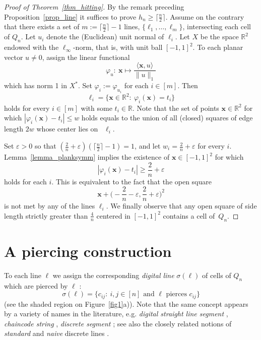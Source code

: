 \documentclass[11pt,a4paper]{amsart}
\newcommand{\R}{\mathbb{R}}
\newcommand{\eps}{\varepsilon}
\newcommand{\x}{\mathbf{x}}
\begin{document}
\begin{proof}[Proof of Theorem~\ref{thm_hitting}]
By the remark  preceding Proposition~\ref{prop_line}  it suffices to prove $h_n \geq \lceil \frac n 2 \rceil$. Assume on the contrary that there exists a set of $m := \lceil \frac n 2 \rceil -1$ lines,
$\{\ell_1, \ldots, \ell_m \}$, intersecting each cell of $Q_n$. Let  $u_i$ denote the (Euclidean) unit normal of $\ell_i$. Let $X$ be the space $\R^2$ endowed with the $\ell_\infty$-norm, that is, with unit ball $[-1,1]^2$. To each planar vector $u \neq 0$, assign the linear functional
\begin{equation}\label{phidef}
\varphi_u: \ \x \mapsto \frac{  \langle \x, u \rangle }{\|u \|_1}
\end{equation}
which has norm 1 in $X^*$.
Set $\varphi_i := \varphi_{u_i}$ for each $i \in [m]$. Then
\begin{equation}\label{ellidef}
\ell_i = \{\x \in \R^2: \ \varphi_i(\x) = t_i  \}
\end{equation}
holds for every $i \in [m]$ with some $t_i \in \R$.
Note that the set of points $\x \in \R^2$ for which $|\varphi_i(\x) - t_i| \leq w$ holds equals to the union of all (closed) squares of edge length $ 2 w$ whose center lies on~ $\ell_i$.

Set $\eps >0 $ so that $(\frac 2 n + \eps)(\lceil \frac n 2 \rceil - 1) = 1$, and let $w_i = \frac 2 n + \eps$ for every $i$. Lemma~\ref{lemma_planksymm} implies the existence of $\x \in [- 1,1]^2$ for which
\[
|\varphi_i(\x) - t_i|\geq \frac 2 n + \eps
\]
holds for each $i$. This is equivalent to the fact that the open square
\[
\x + \Big(- \frac 2  n  - \eps, \frac 2 n  + \eps \Big)^2
\]
is not met by any of the lines $\ell_i$. We finally observe that any open square of side length strictly greater than $\frac 4 n $ centered in $[-1,1]^2$   contains a cell of~$Q_n$.
\end{proof}




\section{A piercing construction}



To each line $\ell$ we assign the corresponding {\em digital line}  \cite{R91} $\sigma(\ell)$ of cells of $Q_n$ which are pierced by $\ell$ :
\begin{equation}\label{sigmadef}
  \sigma(\ell) = \{ c_{ij}: \ i,j \in [n] \textrm{ and } \ell \textrm{ pierces }  c_{ij} \}
\end{equation}
(see the shaded region on Figure~\ref{fig1}a)). Note that the same concept appears by a variety of names in the literature, e.g. {\em digital straight line segment} \cite{R74}, 
{\em chaincode string} \cite{DS84}, {\em discrete segment} \cite{MI85}; see also the closely related notions of  {\em standard} and {\em naive}  discrete lines \cite{DRR95}.
\end{document}
